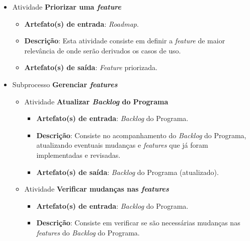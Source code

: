 \begin{itemize}
     \item Atividade \textbf{Priorizar uma \textit{feature}}
      
	  \begin{itemize}
	    \item \textbf{Artefato(s) de entrada}: \textit{Roadmap}.
	    
	    \item \textbf{Descrição}: Esta atividade consiste em definir a \textit{feature} de maior relevância
	      de onde serão derivados os casos de uso.
	    
	    \item \textbf{Artefato(s) de saída}: \textit{Feature} priorizada.
		  
	  \end{itemize}
	
     \item Subprocesso \textbf{Gerenciar \textit{features}}
     
	\begin{itemize}
	 
	 \item Atividade \textbf{Atualizar \textit{Backlog} do Programa}
	    
	    \begin{itemize}
	      \item \textbf{Artefato(s) de entrada}: \textit{Backlog} do Programa.

	      \item \textbf{Descrição}: Consiste no acompanhamento do \textit{Backlog} do Programa, atualizando
		eventuais mudanças e \textit{features} que já foram implementadas e revisadas.
	      
	      \item \textbf{Artefato(s) de saída}: \textit{Backlog} do Programa (atualizado).
		    
	    \end{itemize}
	    
	 \item Atividade \textbf{Verificar mudanças nas \textit{features}}
	    
	    \begin{itemize}
	      \item \textbf{Artefato(s) de entrada}: \textit{Backlog} do Programa.

	      \item \textbf{Descrição}: Consiste em verificar se são necessárias mudanças nas \textit{features} do
		\textit{Backlog} do Programa.
	      

\end{itemize}
\end{itemize}
\end{itemize}

